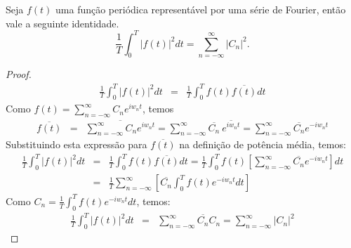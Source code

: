   

\begin{teo} Seja $f(t)$ uma função periódica representável por uma série de Fourier, então vale a seguinte identidade.
\begin{equation}\label{teo_parseval} 
\frac{1}{T}\int_0^T |f(t)|^2dt=\sum_{n=-\infty}^\infty |C_n|^2.
 \end{equation}
\end{teo}
\begin{proof}
\begin{eqnarray*}
 \frac{1}{T}\int_0^T |f(t)|^2dt&=&\frac{1}{T}\int_0^T f(t)\overline{f(t)}dt
\end{eqnarray*}
 Como $\displaystyle f(t)=\sum_{n=-\infty}^\infty C_n e^{iw_n t}$, temos
 \begin{eqnarray*}
  \overline{f(t)}&=&\overline{\sum_{n=-\infty}^\infty C_n e^{iw_n t}}
  =\sum_{n=-\infty}^\infty \overline{C_n}~ \overline{e^{iw_n t}}
  =\sum_{n=-\infty}^\infty \overline{C_n} e^{-iw_n t}
 \end{eqnarray*}
Substituindo esta expressão para $\overline{f(t)}$ na definição de potência média, temos:
\begin{eqnarray*}
 \frac{1}{T}\int_0^T |f(t)|^2dt&=&\frac{1}{T}\int_0^T f(t)\overline{f(t)}dt=\frac{1}{T}\int_0^Tf(t)\left[\sum_{n=-\infty}^\infty \overline{C_n} e^{-iw_n t}\right] dt\\
 &=&\frac{1}{T}\sum_{n=-\infty}^\infty\left[\overline{C_n}\int_0^Tf(t)e^{-iw_nt}dt\right]
 \end{eqnarray*}
 Como $C_n=\frac{1}{T}\int_0^Tf(t)e^{-iw_nt}dt$, temos:
\begin{eqnarray*}
 \frac{1}{T}\int_0^T |f(t)|^2dt&=&\sum_{n=-\infty}^\infty\overline{C_n}C_n = \sum_{n=-\infty}^\infty|C_n|^2
 \end{eqnarray*}
 
\end{proof}


